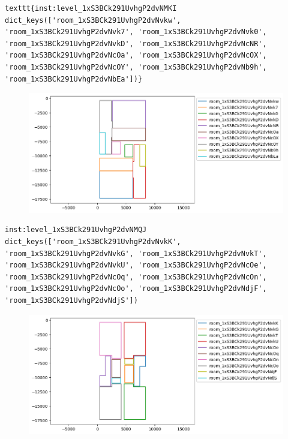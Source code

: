 \begin{verbatim}
texttt{inst:level_1xS3BCk291UvhgP2dvNMKI
dict_keys(['room_1xS3BCk291UvhgP2dvNvkw', 'room_1xS3BCk291UvhgP2dvNvk7', 'room_1xS3BCk291UvhgP2dvNvk0', 'room_1xS3BCk291UvhgP2dvNvkD', 'room_1xS3BCk291UvhgP2dvNcNR', 'room_1xS3BCk291UvhgP2dvNcOa', 'room_1xS3BCk291UvhgP2dvNcOX', 'room_1xS3BCk291UvhgP2dvNcOY', 'room_1xS3BCk291UvhgP2dvNb9h', 'room_1xS3BCk291UvhgP2dvNbEa'])}
\end{verbatim}

\begin{figure}[H]
  \includegraphics[width=\textwidth]{figures/png/WKT output/output1.png}
\end{figure}

\begin{verbatim}
inst:level_1xS3BCk291UvhgP2dvNMQJ
dict_keys(['room_1xS3BCk291UvhgP2dvNvkK', 'room_1xS3BCk291UvhgP2dvNvkG', 'room_1xS3BCk291UvhgP2dvNvkT', 'room_1xS3BCk291UvhgP2dvNvkU', 'room_1xS3BCk291UvhgP2dvNcOe', 'room_1xS3BCk291UvhgP2dvNcOq', 'room_1xS3BCk291UvhgP2dvNcOn', 'room_1xS3BCk291UvhgP2dvNcOo', 'room_1xS3BCk291UvhgP2dvNdjF', 'room_1xS3BCk291UvhgP2dvNdjS'])
\end{verbatim}

\begin{figure}[H]
  \includegraphics[width=\textwidth]{figures/png/WKT output/output2.png}
\end{figure}

